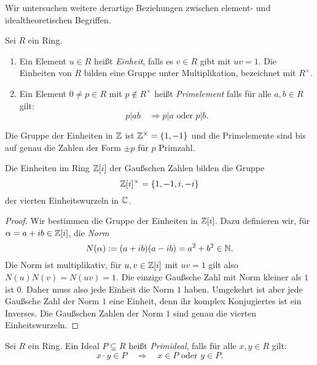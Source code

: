 \documentclass{book}
\begin{document}
Wir untersuchen weitere derartige Beziehungen zwischen element- und idealtheoretischen
Begriffen.

\begin{term}
    \label{term:einheitprim}
    Sei $R$ ein Ring. 
    \begin{enumerate}
        \item {}Ein Element $u \in R$ heißt \emph{Einheit}, falls es $v \in R$
            gibt mit $uv =1$. Die Einheiten von $R$ bilden eine Gruppe unter
            Multiplikation, bezeichnet mit $R^{\times}$. 
        \item {}Ein Element $0 \neq p \in R$ mit $p \notin R^{\times}$ heißt
            \emph{Primelement} falls für alle $a,b \in R$ gilt: 
            \[
                p|ab \quad \Rightarrow \text{$p|a$ oder $p|b$}. 
            \]
    \end{enumerate}
\end{term}

\begin{exa}
        Die Gruppe der Einheiten in $\mathbb{Z}$ ist $\mathbb{Z}^{\times} = \{1, -1 \}$ und
        die Primelemente sind bis auf genau die Zahlen der Form $\pm p$ für $p$
        Primzahl.
\end{exa}

\begin{prop}
    \label{prop:gausseinheiten}
    Die Einheiten im Ring $\mathbb{Z}[i]$ der Gaußschen Zahlen bilden die Gruppe
    \[
        \mathbb{Z}[i]^{\times} = \{1, -1, i, -i \}
    \]
    der vierten Einheitswurzeln in $\mathbb{C}$.
\end{prop}
\begin{proof}
    Wir bestimmen die Gruppe der Einheiten in $\mathbb{Z}[i]$. Dazu definieren wir, für $\alpha = a+ib \in \mathbb{Z}[i]$, die \emph{Norm} 
        \[
            N(\alpha) := (a + i b) (a - i b) = a^2 + b^2 \in \mathbb{N}.
        \]
        Die Norm ist multiplikativ, für $u,v \in \mathbb{Z}[i]$ mit $uv = 1$ gilt
        also $N(u)N(v) = N(uv) = 1$. Die einzige Gaußsche Zahl mit Norm
        kleiner als $1$ ist $0$. Daher muss also jede Einheit die Norm $1$
        haben. Umgekehrt ist aber jede Gaußsche Zahl der Norm $1$ eine
        Einheit, denn ihr komplex Konjugiertes ist ein Inverses. Die Gaußschen
        Zahlen der Norm $1$ sind genau die vierten Einheitswurzeln.
\end{proof}

\begin{defi}
    \label{defi:prim}
    Sei $R$ ein Ring. Ein Ideal $P \subsetneq R$ heißt \emph{Primideal}, falls für alle $x,y \in R$ gilt:
    \[
        x \cdot y \in P \quad \Rightarrow \quad \text{$x \in P$ oder $y \in P$}.
    \]
\end{defi}
\end{document}
